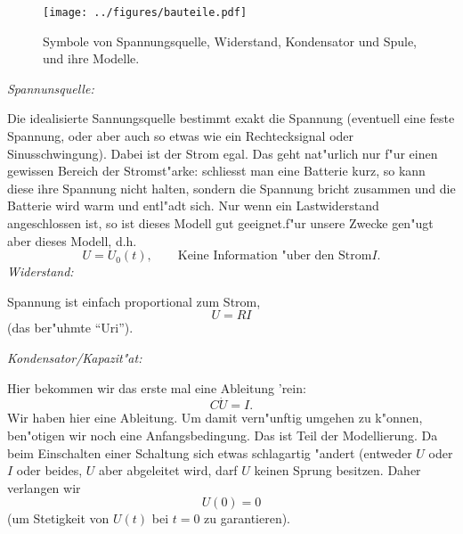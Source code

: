 \begin{figure}[htbp] %
   \centering
   \texttt{[image: ../figures/bauteile.pdf]} 
   \caption{Symbole von Spannungsquelle, Widerstand, Kondensator und Spule, und ihre Modelle.
   }
   \label{ele1}
\end{figure}


{\it Spannunsquelle:}\par
Die idealisierte Sannungsquelle bestimmt exakt die Spannung (eventuell eine feste
Spannung, oder aber auch so etwas wie ein Rechtecksignal oder Sinusschwingung). 
Dabei ist der Strom egal. Das geht nat"urlich nur f"ur einen gewissen Bereich der 
Stromst"arke: schliesst man eine
Batterie kurz, so kann diese ihre Spannung nicht halten, sondern die Spannung 
bricht zusammen und die Batterie wird warm
und entl"adt sich. Nur wenn ein Lastwiderstand angeschlossen ist, so ist dieses
Modell gut geeignet.f"ur unsere Zwecke gen"ugt aber dieses Modell, d.h.
$$ U = U_0(t), \qquad \mbox{Keine Information "uber den Strom} I. $$
{\it Widerstand:}\par
Spannung ist einfach proportional zum Strom,
$$ U = RI$$
(das ber"uhmte ``Uri'').\par
{\it Kondensator/Kapazit"at:}\par
Hier bekommen wir das erste mal eine Ableitung 'rein:
$$ C \dot U = I.$$
Wir haben hier eine Ableitung. Um damit vern"unftig umgehen zu k"onnen, ben"otigen 
wir noch
eine Anfangsbedingung. Das ist Teil der Modellierung. Da beim Einschalten einer 
Schaltung
sich etwas schlagartig "andert (entweder $U$ oder $I$ oder beides, $U$ aber 
abgeleitet wird,
darf $U$ keinen Sprung besitzen. Daher verlangen wir 
$$U(0)=0$$
 (um Stetigkeit von $U(t)$ bei $t=0$ zu garantieren).

